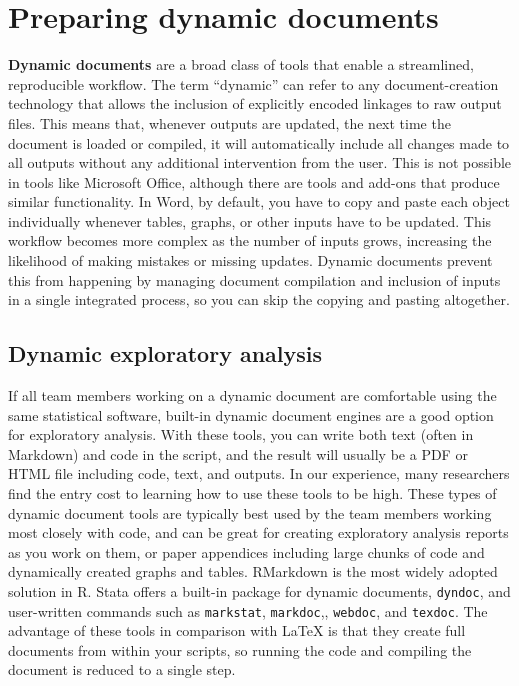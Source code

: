 \section{Preparing dynamic documents}

\textbf{Dynamic documents}
are a broad class of tools that enable a streamlined, reproducible workflow.
The term ``dynamic'' can refer to any document-creation technology
that allows the inclusion of explicitly encoded linkages to raw output files.
This means that, whenever outputs are updated,
the next time the document is loaded or compiled, it will automatically include
all changes made to all outputs without any additional intervention from the user.
This is not possible in tools like Microsoft Office,
although there are tools and add-ons that produce similar functionality.
In Word, by default, you have to copy and paste each object individually
whenever tables, graphs, or other inputs have to be updated.
This workflow becomes more complex as the number of inputs grows,
increasing the likelihood of making mistakes or missing updates.
Dynamic documents prevent this from happening by managing document compilation and
inclusion of inputs in a single integrated process,
so you can skip the copying and pasting altogether.

\subsection{Dynamic exploratory analysis}

If all team members working on a dynamic document are comfortable using the same statistical software,
built-in dynamic document engines are a good option for exploratory analysis.
With these tools,
you can write both text (often in Markdown) and code in the script,
and the result will usually be a PDF or HTML file including code, text, and outputs.
In our experience, many researchers find the entry cost to learning how to use these tools to be high.
These types of dynamic document tools are typically best used by the team members working most closely with code,
and can be great for creating exploratory analysis reports as you work on them,
or paper appendices including large chunks of code and dynamically created graphs and tables.
RMarkdown is the most widely adopted solution in R.
Stata offers a built-in package for dynamic documents, \texttt{dyndoc},
and user-written commands such as \texttt{markstat},
\texttt{markdoc},,
\texttt{webdoc}, and
\texttt{texdoc}.
The advantage of these tools in comparison with LaTeX is that
they create full documents from within your scripts,
so running the code and compiling the document is reduced to a single step.

